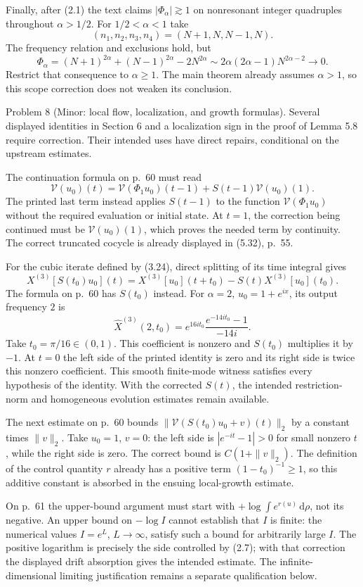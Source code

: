 \documentclass[10pt]{article}
\begin{document}
Finally, after (2.1) the text claims \(|\Phi_\alpha|\gtrsim1\) on nonresonant integer quadruples throughout \(\alpha>1/2\). For \(1/2<\alpha<1\) take \[(n_1,n_2,n_3,n_4)=(N+1,N,N-1,N).\] The frequency relation and exclusions hold, but \[\Phi_\alpha=(N+1)^{2\alpha}+(N-1)^{2\alpha}-2N^{2\alpha}
 \sim2\alpha(2\alpha-1)N^{2\alpha-2}\to0.\] Restrict that consequence to \(\alpha\ge1\). The main theorem already assumes \(\alpha>1\), so this scope correction does not weaken its conclusion.\par
Problem 8 (Minor: local flow, localization, and growth formulas).  Several displayed identities in Section 6 and a localization sign in the proof of Lemma 5.8 require correction. Their intended uses have direct repairs, conditional on the upstream estimates.\par
The continuation formula on p. 60 must read \[\mathcal V(u_0)(t)=\mathcal V(\Phi_1u_0)(t-1)+S(t-1)\mathcal V(u_0)(1).\] The printed last term instead applies \(S(t-1)\) to the function \(\mathcal V(\Phi_1u_0)\) without the required evaluation or initial state. At \(t=1\), the correction being continued must be \(\mathcal V(u_0)(1)\), which proves the needed term by continuity. The correct truncated cocycle is already displayed in (5.32), p. 55.\par
For the cubic iterate defined by (3.24), direct splitting of its time integral gives \[X^{(3)}[S(t_0)u_0](t)
 =X^{(3)}[u_0](t+t_0)-S(t)X^{(3)}[u_0](t_0).\] The formula on p. 60 has \(S(t_0)\) instead. For \(\alpha=2\), \(u_0=1+e^{ix}\), its output frequency \(2\) is \[\widehat X^{(3)}(2,t_0)
 =e^{16it_0}\frac{e^{-14it_0}-1}{-14i}.\] Take \(t_0=\pi/16\in(0,1)\). This coefficient is nonzero and \(S(t_0)\) multiplies it by \(-1\). At \(t=0\) the left side of the printed identity is zero and its right side is twice this nonzero coefficient. This smooth finite-mode witness satisfies every hypothesis of the identity. With the corrected \(S(t)\), the intended restriction-norm and homogeneous evolution estimates remain available.\par
The next estimate on p. 60 bounds \(\|\mathcal V(S(t_0)u_0+v)(t)\|_2\) by a constant times \(\|v\|_2\). Take \(u_0=1\), \(v=0\): the left side is \(|e^{-it}-1|>0\) for small nonzero \(t\), while the right side is zero. The correct bound is \(C(1+\|v\|_2)\). The definition of the control quantity \(r\) already has a positive term \((1-t_0)^{-1}\ge1\), so this additive constant is absorbed in the ensuing local-growth estimate.\par
On p. 61 the upper-bound argument must start with \(+\log\int e^{r(u)}\,\mathrm d\rho\), not its negative. An upper bound on \(-\log I\) cannot establish that \(I\) is finite: the numerical values \(I=e^L\), \(L\to\infty\), satisfy such a bound for arbitrarily large \(I\). The positive logarithm is precisely the side controlled by (2.7); with that correction the displayed drift absorption gives the intended estimate. The infinite-dimensional limiting justification remains a separate qualification below.\par
\end{document}
